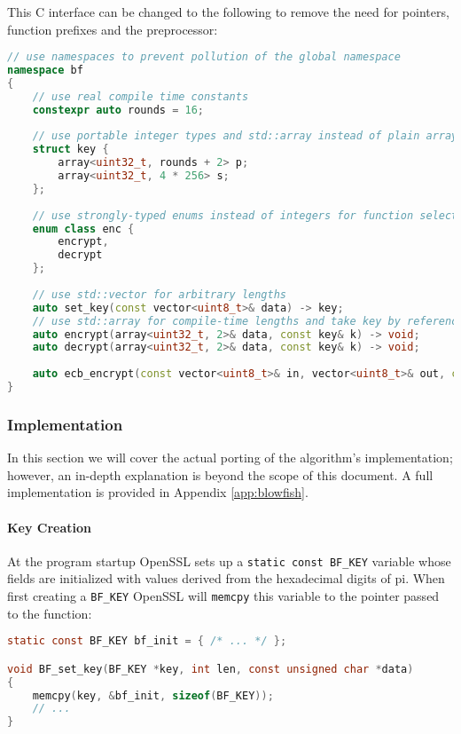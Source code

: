 This C interface can be changed to the following to remove the need for pointers, function prefixes and the preprocessor:

\begin{lstlisting}[language=C++]
// use namespaces to prevent pollution of the global namespace
namespace bf
{
    // use real compile time constants
    constexpr auto rounds = 16;
    
    // use portable integer types and std::array instead of plain arrays
    struct key {
        array<uint32_t, rounds + 2> p;
        array<uint32_t, 4 * 256> s;
    };
    
    // use strongly-typed enums instead of integers for function selection
    enum class enc {
        encrypt,
        decrypt
    };
    
    // use std::vector for arbitrary lengths
    auto set_key(const vector<uint8_t>& data) -> key;
    // use std::array for compile-time lengths and take key by reference
    auto encrypt(array<uint32_t, 2>& data, const key& k) -> void;
    auto decrypt(array<uint32_t, 2>& data, const key& k) -> void;
    
    auto ecb_encrypt(const vector<uint8_t>& in, vector<uint8_t>& out, const key& k, enc e) -> void;
}
\end{lstlisting}

\subsubsection{Implementation}

In this section we will cover the actual porting of the algorithm's implementation; however, an in-depth explanation is beyond the scope of this document. A full implementation is provided in Appendix \ref{app:blowfish}.

\paragraph{Key Creation}

At the program startup OpenSSL sets up a \texttt{static const BF\_KEY} variable whose fields are initialized with values derived from the hexadecimal digits of pi. When first creating a \texttt{BF\_KEY} OpenSSL will \texttt{memcpy} this variable to the pointer passed to the function:

\begin{lstlisting}[language=C]
static const BF_KEY bf_init = { /* ... */ };

void BF_set_key(BF_KEY *key, int len, const unsigned char *data)
{
    memcpy(key, &bf_init, sizeof(BF_KEY));
    // ...
}
\end{lstlisting}

